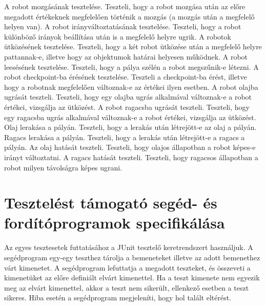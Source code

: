 	{A robot mozgásának tesztelése.}	{Teszteli, hogy a robot mozgása után az előre megadott értékeknek megfelelően történik a mozgás (a mozgás után a megfelelő helyen van).}
	{A robot irányváltoztatásának tesztelése.}	{Teszteli, hogy a robot különböző irányok beállítása után is a megfelelő helyre ugrik.}
	{A robotok ütközésének tesztelése.}	{Teszteli, hogy a két robot ütközése után a megfelelő helyre pattannak-e, illetve hogy az objektumok határai helyesen működnek.}
	{A robot leesésének tesztelése.}	{Teszteli, hogy a pálya szélén a robot megszűnik-e létezni.}
	{A robot checkpoint-ba érésének tesztelése.}	{Teszteli a checkpoint-ba érést, illetve hogy a robotnak megfelelően változnak-e az értékei ilyen esetben.}
	{A robot olajba ugrását teszteli.}	{Teszteli, hogy egy olajba ugrás alkalmával változnak-e a robot értékei, vizsgálja az ütközést.}
	{A robot ragacsba ugrását teszteli.}	{Teszteli, hogy egy ragacsba ugrás alkalmával változnak-e a robot értékei, vizsgálja az ütközést.}
	{Olaj lerakása a pályán.}	{Teszteli, hogy a lerakás után létrejött-e az olaj a pályán.}
	{Ragacs lerakása a pályán.}	{Teszteli, hogy a lerakás után létrejött-e a ragacs a pályán.}
	{Az olaj hatását teszteli.}	{Teszteli, hogy olajos állapotban a robot képes-e irányt változtatni.}
	{A ragacs hatását teszteli.}	{Teszteli, hogy ragacsos állapotban a robot milyen távolságra képes ugrani.}

\section{Tesztelést támogató segéd- és fordítóprogramok specifikálása}

Az egyes tesztesetek futtatásához a JUnit tesztelő keretrendszert használjuk. A segédprogram egy-egy teszthez tárolja a bemeneteket illetve az adott bemenethez várt kimenetet. A segédprogram lefuttatja a megadott teszteket, és összeveti a kimenetüket az előre definiált elvárt kimenettel. Ha a teszt kimenete nem egyezik meg az elvárt kimenettel, akkor a teszt nem sikerült, ellenkező esetben a teszt sikeres. Hiba esetén a segédprogram megjeleníti, hogy hol talált eltérést.

